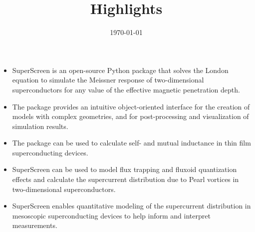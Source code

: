 \documentclass{article} %
\title{Highlights}
\date{\today}
\begin{document}
\maketitle
\begin{itemize}
    \item{SuperScreen is an open-source Python package that solves the London equation to simulate the Meissner response of two-dimensional superconductors for any value of the effective magnetic penetration depth.}
    \item{The package provides an intuitive object-oriented interface for the creation of models with complex geometries, and for post-processing and visualization of simulation results.}
    \item{The package can be used to calculate self- and mutual inductance in thin film superconducting devices.}
    \item{SuperScreen can be used to model flux trapping and fluxoid quantization effects and calculate the supercurrent distribution due to Pearl vortices in two-dimensional superconductors.}
    \item{SuperScreen enables quantitative modeling of the supercurrent distribution in mesoscopic superconducting devices to help inform and interpret measurements.}
\end{itemize}
\end{document}

